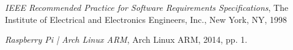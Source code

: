 \begingroup
\renewcommand{\section}[2]{}%
\begin{thebibliography}{99}
	\textit{IEEE Recommended Practice for Software Requirements Specifications},
	The Institute of Electrical and Electronics Engineers, Inc., New York, NY,
	1998
	
	\textit{Raspberry Pi | Arch Linux ARM},
	Arch Linux ARM,
	2014, pp. 1.
\end{thebibliography}
